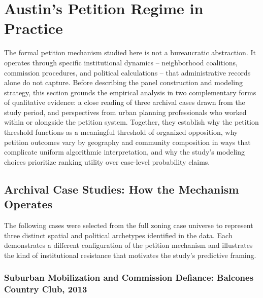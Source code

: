 
\section{Austin's Petition Regime in Practice}
\label{sec:planning_context}

The formal petition mechanism studied here is not a bureaucratic abstraction. It operates through specific institutional dynamics -- neighborhood coalitions, commission procedures, and political calculations -- that administrative records alone do not capture. Before describing the panel construction and modeling strategy, this section grounds the empirical analysis in two complementary forms of qualitative evidence: a close reading of three archival cases drawn from the study period, and perspectives from urban planning professionals who worked within or alongside the petition system. Together, they establish why the petition threshold functions as a meaningful threshold of organized opposition, why petition outcomes vary by geography and community composition in ways that complicate uniform algorithmic interpretation, and why the study's modeling choices prioritize ranking utility over case-level probability claims.

\subsection{Archival Case Studies: How the Mechanism Operates}
\label{subsec:case_studies}

The following cases were selected from the full zoning case universe to represent three distinct spatial and political archetypes identified in the data. Each demonstrates a different configuration of the petition mechanism and illustrates the kind of institutional resistance that motivates the study's predictive framing.

\subsubsection{Suburban Mobilization and Commission Defiance: Balcones Country Club, 2013}

